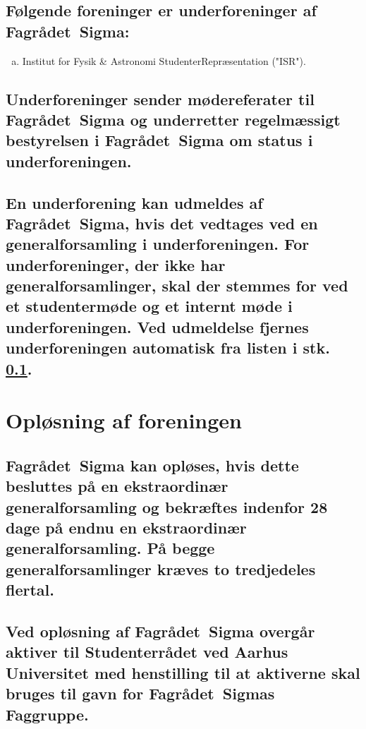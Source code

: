 \documentclass[10pt, danish]{article}
\newcommand{\fagr}{Fagrådet~Sigma}
\begin{document}
	\subsection{Følgende foreninger er underforeninger af \fagr{}:}\label{underforeninger:liste}
	
	\begin{enumerate}[a), nosep]
		\item Institut for Fysik \& Astronomi StudenterRepræsentation ("ISR").
	\end{enumerate}
	
	\subsection{Underforeninger sender mødereferater til \fagr{} og underretter regelmæssigt bestyrelsen i \fagr{} om status i underforeningen.}
	
	\subsection{En underforening kan udmeldes af \fagr{}, hvis det vedtages ved en generalforsamling i underforeningen. For underforeninger, der ikke har generalforsamlinger, skal der stemmes for ved et studentermøde og et internt møde i underforeningen. Ved udmeldelse fjernes underforeningen automatisk fra listen i stk. \ref{underforeninger:liste}.}
	
	\section{Opløsning af foreningen}
	
	\subsection{\fagr{} kan opløses, hvis dette besluttes på en ekstraordinær generalforsamling og bekræftes indenfor 28 dage på endnu en ekstraordinær generalforsamling. På begge generalforsamlinger kræves to tredjedeles flertal.}
	
	\subsection{\sloppy Ved opløsning af \fagr{} overgår aktiver til Studenterrådet ved Aarhus Universitet med henstilling til at aktiverne skal bruges til gavn for \fagr{}s Faggruppe.}
	
	\section*{}
	
\end{document}
